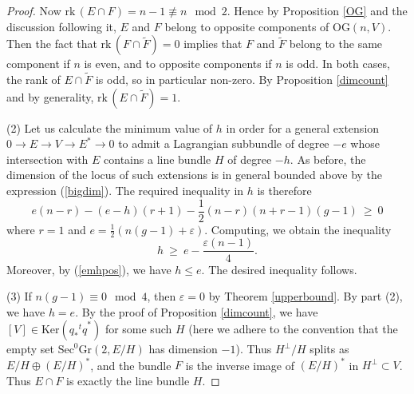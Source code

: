 \documentclass[10pt]{amsart}
\numberwithin{equation}{section}
\newcommand{\rank}{\mathrm{rk}\,}
\newcommand{\Ker}{\mathrm{Ker}}
\newcommand{\Sec}{\mathrm{Sec}}
\newcommand{\Gr}{\mathrm{Gr}}
\newcommand{\OG}{\mathrm{OG}}
\begin{document}
\begin{proof}
Now $\rank(E \cap F) = n-1 \not\equiv n \mod 2$. Hence by Proposition \ref{OG} and the discussion following it, $E$ and $F$ belong to opposite components of $\OG(n, V)$. Then the fact that $\rank (F \cap \widetilde{F}) = 0$ implies that $F$ and $\widetilde{F}$ belong to the same component if $n$ is even, and to opposite components if $n$ is odd. In both cases, the rank of $E \cap \widetilde{F}$ is odd, so in particular non-zero. By Proposition \ref{dimcount} and by generality, $\rank (E \cap \widetilde{F}) = 1$.\\
\par
(2) %
 Let us calculate the minimum value of $h$ in order for a general extension $0 \to E \to V \to E^* \to 0$ to admit a Lagrangian subbundle of degree $-e$ whose intersection with $E$ contains a line bundle $H$ of degree $-h$. As before, the dimension of the locus of such extensions is in general bounded above by the expression (\ref{bigdim}). The required inequality in $h$ is therefore
\[ e(n - r) - (e - h)(r + 1) - \frac{1}{2}(n - r)(n + r - 1)(g - 1) \ \ge \ 0 \]
where $r=1$ and $e = \frac{1}{2}(n(g-1)+\varepsilon)$. Computing, we obtain the inequality
\[ h \ \ge \ e - \frac{\varepsilon(n - 1)}{4}. \]
Moreover, by (\ref{emhpos}), we have $h \le e$. The desired inequality follows.\\
\par
(3) If $n(g-1) \equiv 0 \mod 4$, then $\varepsilon = 0$ by Theorem \ref{upperbound}. By part (2), we have $h = e$. By the proof of Proposition \ref{dimcount}, we have $[V] \in \Ker \left( q_* {^tq}^* \right)$ for some such $H$ (here we adhere to the convention that the empty set $\Sec^0 \Gr(2, E/H)$ has dimension $-1$). Thus $H^\perp / H$ splits as $E/H \oplus (E/H)^*$, and the bundle $F$ is the inverse image of $(E/H)^*$ in $H^\perp \subset V$. Thus $E \cap F$ is exactly the line bundle $H$. %

\end{proof}
\end{document}
